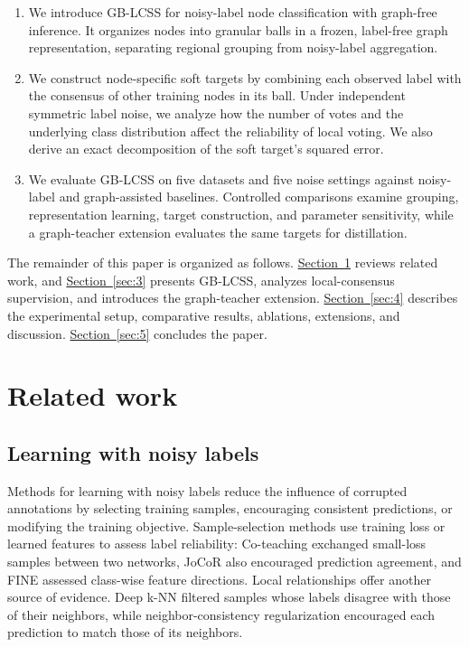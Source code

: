 \documentclass[10pt,letterpaper,nopreprintline]{elsarticle}
\theoremstyle{plain}
\begin{document}
\begin{enumerate}[label=(\arabic*)]
\item We introduce GB-LCSS for noisy-label node classification with graph-free inference. It organizes nodes into granular balls in a frozen, label-free graph representation, separating regional grouping from noisy-label aggregation.
\item We construct node-specific soft targets by combining each observed label with the consensus of other training nodes in its ball. Under independent symmetric label noise, we analyze how the number of votes and the underlying class distribution affect the reliability of local voting. We also derive an exact decomposition of the soft target's squared error.
\item We evaluate GB-LCSS on five datasets and five noise settings against noisy-label and graph-assisted baselines. Controlled comparisons examine grouping, representation learning, target construction, and parameter sensitivity, while a graph-teacher extension evaluates the same targets for distillation.
\end{enumerate}

The remainder of this paper is organized as follows. \hyperref[sec:2]{Section~\ref*{sec:2}} reviews related work, and \hyperref[sec:3]{Section~\ref*{sec:3}} presents GB-LCSS, analyzes local-consensus supervision, and introduces the graph-teacher extension. \hyperref[sec:4]{Section~\ref*{sec:4}} describes the experimental setup, comparative results, ablations, extensions, and discussion. \hyperref[sec:5]{Section~\ref*{sec:5}} concludes the paper.

\section{Related work}\label{sec:2}

\subsection{Learning with noisy labels}\label{sec:2.1}

Methods for learning with noisy labels reduce the influence of corrupted annotations by selecting training samples, encouraging consistent predictions, or modifying the training objective. Sample-selection methods use training loss or learned features to assess label reliability: Co-teaching \cite{ref17} exchanged small-loss samples between two networks, JoCoR \cite{ref18} also encouraged prediction agreement, and FINE \cite{ref20} assessed class-wise feature directions. Local relationships offer another source of evidence. Deep k-NN \cite{ref11} filtered samples whose labels disagree with those of their neighbors, while neighbor-consistency regularization \cite{ref10} encouraged each prediction to match those of its neighbors.
\end{document}
